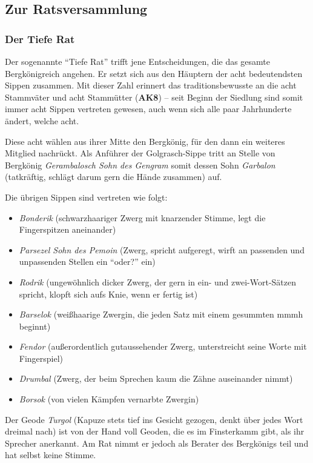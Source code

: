\subsection{Zur Ratsversammlung}
\subsubsection{Der Tiefe Rat}
Der sogenannte \enquote{Tiefe Rat} trifft jene Entscheidungen, die das  gesamte Bergkönigreich angehen.
Er setzt sich aus den Häuptern der acht bedeutendsten Sippen zusammen.
Mit dieser Zahl erinnert das traditionsbewusste \fkv an die acht Stammväter und acht Stammütter (\textbf{AK8}) --
seit Beginn der Siedlung sind somit immer acht Sippen vertreten gewesen, auch wenn sich alle paar Jahrhunderte ändert, welche acht.


Diese acht wählen aus ihrer Mitte den Bergkönig, für den dann ein weiteres Mitglied nachrückt.
Als Anführer der Golgrasch-Sippe tritt an Stelle von Bergkönig \emph{Gerambalosch Sohn des Gengram} somit dessen Sohn
\emph{Garbalon} (tatkräftig, schlägt darum gern die Hände zusammen) auf.

Die übrigen Sippen sind vertreten wie folgt:
\begin{itemize}
\item \emph{Bonderik} (schwarzhaariger Zwerg mit knarzender Stimme, legt die Fingerspitzen aneinander)
\item \emph{Parsezel Sohn des Pemoin} (Zwerg, spricht aufgeregt, wirft an passenden und unpassenden Stellen ein \enquote{oder?} ein)
\item \emph{Rodrik} (ungewöhnlich dicker Zwerg, der gern in ein- und zwei-Wort-Sätzen spricht, klopft sich aufs Knie, wenn er fertig ist)
\item \emph{Barselok} (weißhaarige Zwergin, die jeden Satz mit einem gesummten mmmh beginnt)
\item \emph{Fendor} (außerordentlich gutaussehender Zwerg, unterstreicht seine Worte mit Fingerspiel)
\item \emph{Drumbal} (Zwerg, der beim Sprechen kaum die Zähne auseinander nimmt)
\item \emph{Borsok}  (von vielen Kämpfen vernarbte Zwergin)
\end{itemize}

Der Geode \emph{Turgol} (Kapuze stets tief ins Gesicht gezogen, denkt über jedes Wort dreimal nach) ist von der Hand voll Geoden, die es im Finsterkamm gibt, als ihr Sprecher anerkannt.
Am Rat nimmt er jedoch als Berater des Bergkönigs teil und hat selbst keine Stimme.


